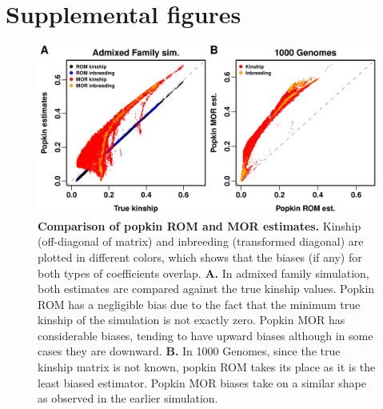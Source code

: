 \documentclass[11pt]{article}
\newcommand{\beginsupplement}{%
  \setcounter{table}{0}
  \renewcommand{\thetable}{S\arabic{table}}%
  \setcounter{figure}{0}
  \renewcommand{\thefigure}{S\arabic{figure}}%
  \setcounter{section}{0}
  \renewcommand{\thesection}{S\arabic{section}}%
  \setcounter{equation}{0}
  \renewcommand{\theequation}{S\arabic{equation}}%
  \setcounter{page}{1}
  \renewcommand{\thepage}{S\arabic{page}}%
}
\begin{document}

\clearpage

\beginsupplement

\section*{Supplemental figures}

\begin{figure}[hp!]
  \centering
  \includegraphics[width=\textwidth]{popkin-mor-rom-bias.png}
  \caption{
    {\bf Comparison of popkin ROM and MOR estimates.}
    Kinship (off-diagonal of matrix) and inbreeding (transformed diagonal) are plotted in different colors, which shows that the biases (if any) for both types of coefficients overlap.
    \textbf{A.}
    In admixed family simulation, both estimates are compared against the true kinship values.
    Popkin ROM has a negligible bias due to the fact that the minimum true kinship of the simulation is not exactly zero.
    Popkin MOR has considerable biases, tending to have upward biases although in some cases they are downward.
    \textbf{B.}
    In 1000 Genomes, since the true kinship matrix is not known, popkin ROM takes its place as it is the least biased estimator.
    Popkin MOR biases take on a similar shape as observed in the earlier simulation.
    }
  \label{fig:popkin-rom-mor}
\end{figure}
\end{document}
